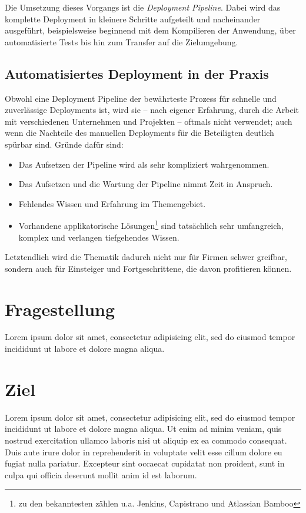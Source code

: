\documentclass{scrartcl}
\begin{document}
Die Umsetzung dieses Vorgangs ist die \emph{Deployment Pipeline}. Dabei wird das komplette Deployment in kleinere Schritte aufgeteilt und nacheinander ausgeführt, beispielsweise beginnend mit dem Kompilieren der Anwendung, über automatisierte Tests bis hin zum Transfer auf die Zielumgebung. \citep{FowlerDP}

\subsection{Automatisiertes Deployment in der Praxis}

Obwohl eine Deployment Pipeline der bewährteste Prozess für schnelle und zuverlässige Deployments ist, wird sie – nach eigener Erfahrung, durch die Arbeit mit verschiedenen Unternehmen und Projekten – oftmals nicht verwendet; auch wenn die Nachteile des manuellen Deployments für die Beteiligten deutlich spürbar sind. Gründe dafür sind:

\begin{itemize}
\item Das Aufsetzen der Pipeline wird als sehr kompliziert wahrgenommen.
\item Das Aufsetzen und die Wartung der Pipeline nimmt Zeit in Anspruch.
\item Fehlendes Wissen und Erfahrung im Themengebiet.
\item Vorhandene applikatorische Lösungen\footnote{zu den bekanntesten zählen u.a. Jenkins, Capistrano und Atlassian Bamboo} sind tatsächlich sehr umfangreich, komplex und verlangen tiefgehendes Wissen.
\end{itemize}

Letztendlich wird die Thematik dadurch nicht nur für Firmen schwer greifbar, sondern auch für Einsteiger und Fortgeschrittene, die davon profitieren können.

\section{Fragestellung}
\label{sec:fragestellung}
Lorem ipsum dolor sit amet, consectetur adipisicing elit, sed do eiusmod tempor incididunt ut labore et dolore magna aliqua.

\section{Ziel}
\label{sec:ziel}
Lorem ipsum dolor sit amet, consectetur adipisicing elit, sed do eiusmod tempor incididunt ut labore et dolore magna aliqua. Ut enim ad minim veniam, quis nostrud exercitation ullamco laboris nisi ut aliquip ex ea commodo consequat. Duis aute irure dolor in reprehenderit in voluptate velit esse cillum dolore eu fugiat nulla pariatur. Excepteur sint occaecat cupidatat non proident, sunt in culpa qui officia deserunt mollit anim id est laborum.
\end{document}
